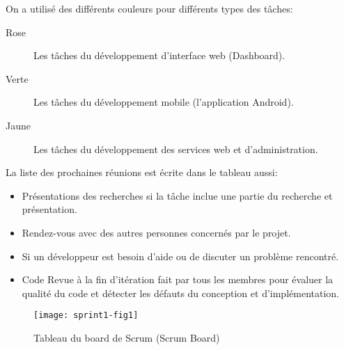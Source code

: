 On a utilisé des différents couleurs pour différents types des tâches:

\begin{description}
    \item [Rose] Les tâches du développement d'interface web (Dashboard).
    \item [Verte] Les tâches du développement mobile (l'application Android).
    \item [Jaune] Les tâches du développement des services web et
        d'administration.
\end{description}

La liste des prochaines réunions est écrite dans le tableau aussi:

\begin{itemize}
    \item Présentations des recherches si la tâche inclue une partie du
        recherche et présentation.
    \item Rendez-vous avec des autres personnes concernés par le projet.
    \item Si un développeur est besoin d'aide ou de discuter un problème
        rencontré.
    \item Code Revue à la fin d'itération fait par tous les membres pour
        évaluer la qualité du code et détecter les défauts du conception et
        d'implémentation.
\end{itemize}

\begin{figure}[H]
    \centering
    \texttt{[image: sprint1-fig1]}
    \caption{Tableau du board de Scrum (Scrum Board)}
\label{fig:scrum-board}
\end{figure}



